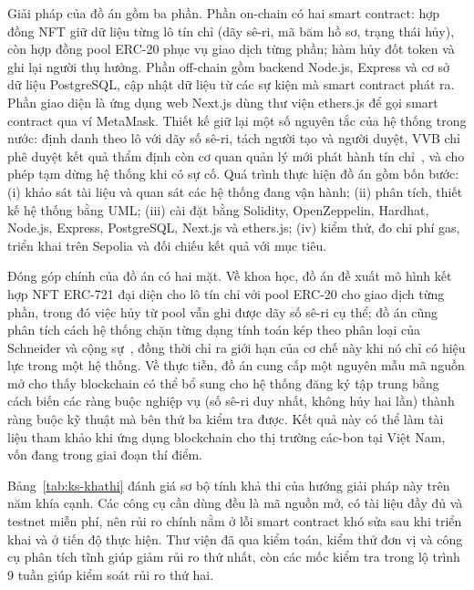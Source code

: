 Giải pháp của đồ án gồm ba phần. Phần on-chain có hai smart contract: hợp đồng NFT giữ dữ liệu từng lô tín chỉ (dãy sê-ri, mã băm hồ sơ, trạng thái hủy), còn hợp đồng pool ERC-20 phục vụ giao dịch từng phần; hàm hủy đốt token và ghi lại người thụ hưởng. Phần off-chain gồm backend Node.js, Express và cơ sở dữ liệu PostgreSQL, cập nhật dữ liệu từ các sự kiện mà smart contract phát ra. Phần giao diện là ứng dụng web Next.js dùng thư viện ethers.js để gọi smart contract qua ví MetaMask. Thiết kế giữ lại một số nguyên tắc của hệ thống trong nước: định danh theo lô với dãy số sê-ri, tách người tạo và người duyệt, VVB chỉ phê duyệt kết quả thẩm định còn cơ quan quản lý mới phát hành tín chỉ~\cite{mae2025qd2935,vietnam2026nghidinh396}, và cho phép tạm dừng hệ thống khi có sự cố. Quá trình thực hiện đồ án gồm bốn bước: (i) khảo sát tài liệu và quan sát các hệ thống đang vận hành; (ii) phân tích, thiết kế hệ thống bằng UML; (iii) cài đặt bằng Solidity, OpenZeppelin, Hardhat, Node.js, Express, PostgreSQL, Next.js và ethers.js; (iv) kiểm thử, đo chi phí gas, triển khai trên Sepolia và đối chiếu kết quả với mục tiêu.

Đóng góp chính của đồ án có hai mặt. Về khoa học, đồ án đề xuất mô hình kết hợp NFT ERC-721 đại diện cho lô tín chỉ với pool ERC-20 cho giao dịch từng phần, trong đó việc hủy từ pool vẫn ghi được dãy số sê-ri cụ thể; đồ án cũng phân tích cách hệ thống chặn từng dạng tính toán kép theo phân loại của Schneider và cộng sự~\cite{schneider2019double}, đồng thời chỉ ra giới hạn của cơ chế này khi nó chỉ có hiệu lực trong một hệ thống. Về thực tiễn, đồ án cung cấp một nguyên mẫu mã nguồn mở cho thấy blockchain có thể bổ sung cho hệ thống đăng ký tập trung bằng cách biến các ràng buộc nghiệp vụ (số sê-ri duy nhất, không hủy hai lần) thành ràng buộc kỹ thuật mà bên thứ ba kiểm tra được. Kết quả này có thể làm tài liệu tham khảo khi ứng dụng blockchain cho thị trường các-bon tại Việt Nam, vốn đang trong giai đoạn thí điểm.

Bảng~\ref{tab:ks-khathi} đánh giá sơ bộ tính khả thi của hướng giải pháp này trên năm khía cạnh. Các công cụ cần dùng đều là mã nguồn mở, có tài liệu đầy đủ và testnet miễn phí, nên rủi ro chính nằm ở lỗi smart contract khó sửa sau khi triển khai và ở tiến độ thực hiện. Thư viện đã qua kiểm toán, kiểm thử đơn vị và công cụ phân tích tĩnh giúp giảm rủi ro thứ nhất, còn các mốc kiểm tra trong lộ trình 9 tuần giúp kiểm soát rủi ro thứ hai.

